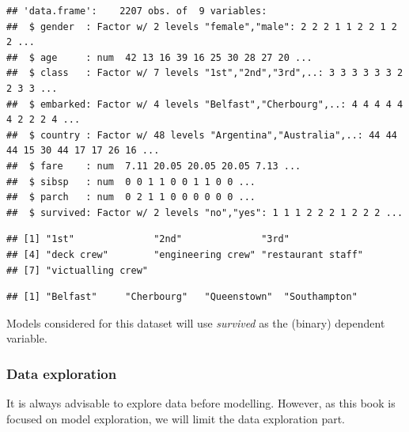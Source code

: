 \documentclass[12pt,]{krantz}
\newenvironment{Shaded}{\begin{snugshade}}{\end{snugshade}}
\newcommand{\KeywordTok}[1]{\textcolor[rgb]{0.13,0.29,0.53}{\textbf{#1}}}
\newcommand{\NormalTok}[1]{#1}
\newcommand{\OperatorTok}[1]{\textcolor[rgb]{0.81,0.36,0.00}{\textbf{#1}}}
\theoremstyle{definition}
\theoremstyle{definition}
\theoremstyle{definition}
\theoremstyle{remark}
\begin{document}
\begin{verbatim}
## 'data.frame':    2207 obs. of  9 variables:
##  $ gender  : Factor w/ 2 levels "female","male": 2 2 2 1 1 2 2 1 2 2 ...
##  $ age     : num  42 13 16 39 16 25 30 28 27 20 ...
##  $ class   : Factor w/ 7 levels "1st","2nd","3rd",..: 3 3 3 3 3 3 2 2 3 3 ...
##  $ embarked: Factor w/ 4 levels "Belfast","Cherbourg",..: 4 4 4 4 4 4 2 2 2 4 ...
##  $ country : Factor w/ 48 levels "Argentina","Australia",..: 44 44 44 15 30 44 17 17 26 16 ...
##  $ fare    : num  7.11 20.05 20.05 20.05 7.13 ...
##  $ sibsp   : num  0 0 1 1 0 0 1 1 0 0 ...
##  $ parch   : num  0 2 1 1 0 0 0 0 0 0 ...
##  $ survived: Factor w/ 2 levels "no","yes": 1 1 1 2 2 2 1 2 2 2 ...
\end{verbatim}

\begin{Shaded}
\end{Shaded}

\begin{verbatim}
## [1] "1st"              "2nd"              "3rd"             
## [4] "deck crew"        "engineering crew" "restaurant staff"
## [7] "victualling crew"
\end{verbatim}

\begin{Shaded}
\end{Shaded}

\begin{verbatim}
## [1] "Belfast"     "Cherbourg"   "Queenstown"  "Southampton"
\end{verbatim}

Models considered for this dataset will use \emph{survived} as the
(binary) dependent variable.

\hypertarget{exploration-titanic}{%
\subsubsection{Data exploration}\label{exploration-titanic}}

It is always advisable to explore data before modelling. However, as
this book is focused on model exploration, we will limit the data
exploration part.
\end{document}

